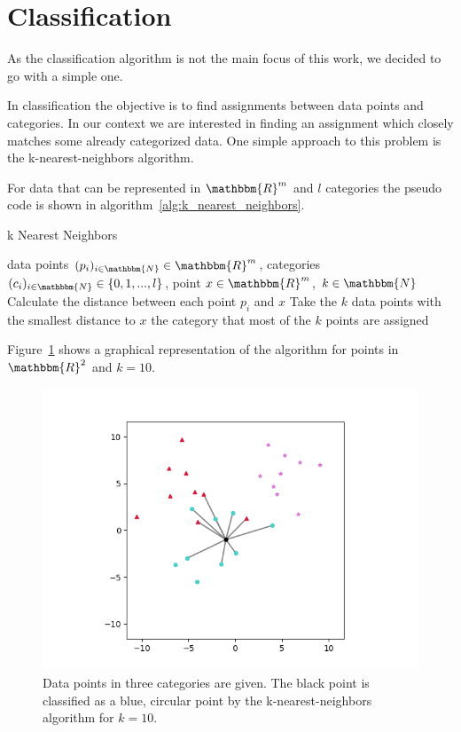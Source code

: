\newpage

\section{Classification}
\label{sec:classification}

As the classification algorithm is not the main focus of this work, we decided to go with a simple one.

In classification the objective is to find assignments between data points and categories. In our context we are interested in finding an assignment which closely matches some already categorized data. One simple approach to this problem is the k-nearest-neighbors algorithm.

For data that can be represented in $\mathbbm{R}^m$ and $l$ categories the pseudo code is shown in algorithm~\ref{alg:k_nearest_neighbors}.

\begin{algorithm}
	\caption{k Nearest Neighbors}\label{alg:k_nearest_neighbors}
	\begin{algorithmic}
		\Require data points $(p_i)_{i \in \mathbbm{N}} \in \mathbbm{R}^{m}$, categories $(c_i)_{i \in \mathbbm{N}} \in \{0, 1, ..., l\}$, point $x \in \mathbbm{R}^{m}$, $k \in \mathbbm{N}$
		\State Calculate the distance between each point $p_i$ and $x$
		\State Take the $k$ data points with the smallest distance to $x$
		\State \Return the category that most of the $k$ points are assigned
	\end{algorithmic}
\end{algorithm}

Figure~\ref{fig:k_nearest_neighbors} shows a graphical representation of the algorithm for points in $\mathbbm{R}^2$ and $k=10$.

\begin{figure}
	\centering
	\includegraphics[width=0.8\linewidth]{figs/k_nearest_neighbors}
	\caption{Data points in three categories are given. The black point is classified as a blue, circular point by the k-nearest-neighbors algorithm for $k=10$.}
	\label{fig:k_nearest_neighbors}
\end{figure}

